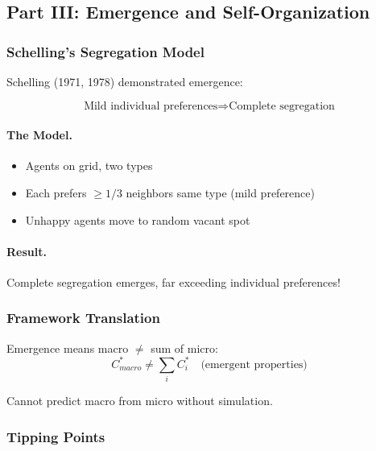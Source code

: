 \subsection{Part III: Emergence and Self-Organization}

\subsubsection{Schelling's Segregation Model}

Schelling (1971, 1978) demonstrated emergence:

\begin{equation}
\boxed{
\text{Mild individual preferences} \Rightarrow \text{Complete segregation}
}
\label{eq:schelling}
\end{equation}

\paragraph{The Model.}
\begin{itemize}
    \item Agents on grid, two types
    \item Each prefers $\geq 1/3$ neighbors same type (mild preference)
    \item Unhappy agents move to random vacant spot
\end{itemize}

\paragraph{Result.}
Complete segregation emerges, far exceeding individual preferences!

\subsubsection{Framework Translation}

Emergence means macro $\neq$ sum of micro:
\begin{equation}
\boxed{
C^*_{macro} \neq \sum_i C^*_i \quad \text{(emergent properties)}
}
\label{eq:emergence}
\end{equation}

Cannot predict macro from micro without simulation.

\subsubsection{Tipping Points}

